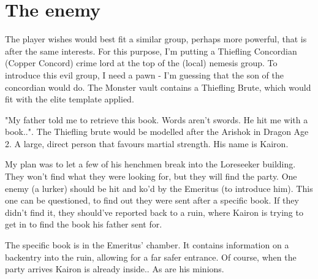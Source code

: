 \section{The enemy}
The player wishes would best fit a similar group, perhaps more powerful, that is after the same interests. For this purpose, I'm putting a Thiefling Concordian (Copper Concord) crime lord at the top of the (local) nemesis group. To introduce this evil group, I need a pawn - I'm guessing that the son of the concordian would do.  The Monster vault  contains a Thiefling Brute, which would fit with the elite template applied. 

"My father told me to retrieve this book. Words aren't swords. He hit me with a book..". The Thiefling brute would be modelled after the Arishok in Dragon Age 2. A large, direct person that favours martial strength. His name is Kairon. 

My plan was to let a few of his henchmen break into the Loreseeker building. They won't find what they were looking for, but they will find the party. One enemy (a lurker) should be hit and ko'd by the Emeritus (to introduce him). This one can be questioned, to find out they were sent after a specific book. If they didn't find it, they should've reported back to a ruin, where Kairon is trying to get in to find the book his father sent for. 

The specific book is in the Emeritus' chamber. It contains information on a backentry into the ruin, allowing for a far safer entrance. Of course, when the party arrives Kairon is already inside.. As are his minions.

